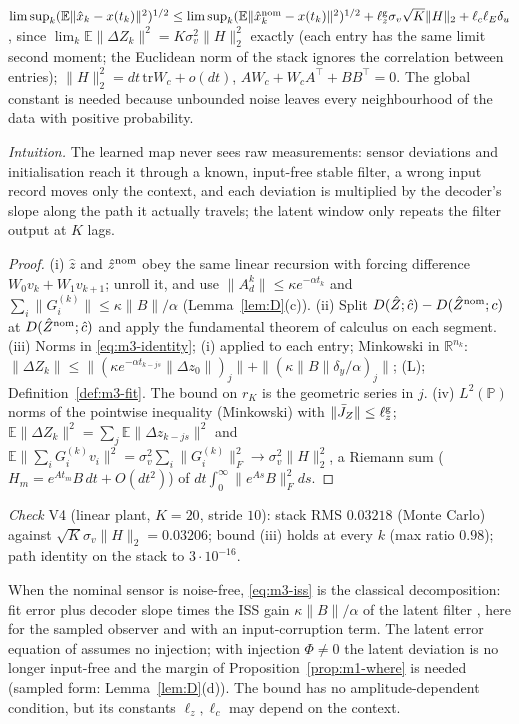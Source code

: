 \begin{proposition}
\begin{enumerate}[label=(\roman*)]
$\limsup_k(\mathbb E\|\hat x_k-x(t_k)\|^2)^{1/2}\le\limsup_k(\mathbb E\|\hat x^{\rm nom}_k-x(t_k)\|^2)^{1/2}+\ell^{\rm g}_z\sigma_v\sqrt K\|H\|_2+\ell_c\ell_E\delta_u$,
since $\lim_k\mathbb E\|\Delta Z_k\|^2=K\sigma_v^2\|H\|_2^2$ exactly (each entry has the same limit second moment; the
Euclidean norm of the stack ignores the correlation between entries); $\|H\|_2^2=dt\,\mathrm{tr}W_c+o(dt)$,
$AW_c+W_cA^\top+BB^\top=0$. The global constant is needed because unbounded noise leaves every neighbourhood of the
data with positive probability.
\end{enumerate}
\end{proposition}

\emph{Intuition.} The learned map never sees raw measurements: sensor deviations and
initialisation reach it through a known, input-free stable filter, a wrong input record moves
only the context, and each deviation is multiplied by the decoder's slope along the path it
actually travels; the latent window only repeats the filter output at $K$ lags.

\begin{proof}
(i) $\hat z$ and $\hat z^{\rm nom}$ obey the same linear recursion with forcing difference
$W_0v_k+W_1v_{k+1}$; unroll it, and use $\|A_d^k\|\le\kappa e^{-\alpha t_k}$ and
$\sum_i\|G^{(k)}_i\|\le\kappa\|B\|/\alpha$ (Lemma~\ref{lem:D}(c)). (ii) Split
$D(\hat Z;\hat c)-D(\hat Z^{\rm nom};c)$ at $D(\hat Z^{\rm nom};\hat c)$ and apply the fundamental theorem of calculus on
each segment. (iii) Norms in \eqref{eq:m3-identity}; (i) applied to each entry; Minkowski in $\mathbb R^{n_k}$:
$\|\Delta Z_k\|\le\|(\kappa e^{-\alpha t_{k-js}}\|\Delta z_0\|)_j\|+\|(\kappa\|B\|\delta_y/\alpha)_j\|$; (L);
Definition~\ref{def:m3-fit}. The bound on $r_K$ is the geometric series in $j$. (iv) $L^2(\mathbb P)$ norms of the pointwise
inequality (Minkowski) with $\|\bar J_Z\|\le\ell^{\rm g}_z$; $\mathbb E\|\Delta Z_k\|^2=\sum_j\mathbb E\|\Delta z_{k-js}\|^2$ and
$\mathbb E\|\sum_iG^{(k)}_iv_i\|^2=\sigma_v^2\sum_i\|G^{(k)}_i\|_F^2\to\sigma_v^2\|H\|_2^2$, a Riemann sum
($H_m=e^{At_m}B\,dt+O(dt^2)$) of $dt\int_0^\infty\|e^{As}B\|_F^2ds$.
\end{proof}
\noindent\emph{Check} V4 (linear plant, $K=20$, stride $10$): stack RMS $0.03218$ (Monte Carlo) against
$\sqrt K\sigma_v\|H\|_2=0.03206$; bound (iii) holds at every $k$ (max ratio $0.98$); path identity on the stack to
$3\cdot10^{-16}$.

When the nominal sensor is noise-free, \eqref{eq:m3-iss} is the classical decomposition: fit
error plus decoder slope times the ISS gain $\kappa\|B\|/\alpha$ of the latent filter
\citep[cf.][Lemma~17 and Theorem~19 of arXiv v2; Lemma~6 and Theorem~4 of v3]{niazi2025kkl}, here for the sampled observer and with an
input-corruption term. The latent error equation of \citet[Proposition~1]{shaaban2026hyperkkl}
assumes no injection; with injection $\Phi\neq0$ the latent deviation is no longer input-free and
the margin of Proposition~\ref{prop:m1-where} is needed (sampled form: Lemma~\ref{lem:D}(d)).
The bound has no amplitude-dependent condition, but its constants $\ell_z,\ell_c$ may depend on the
context.

